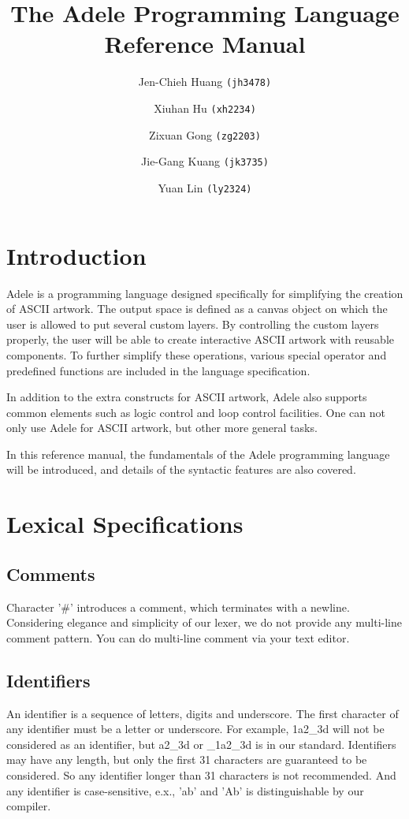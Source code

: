 \documentclass[11pt,letterpaper]{article}
\begin{document}
\title {The Adele Programming Language \\ Reference Manual}
\author {
	Jen-Chieh Huang \texttt{(jh3478)} \and Xiuhan Hu \texttt{(xh2234)} \and     
	Zixuan Gong \texttt{(zg2203)} \and Jie-Gang Kuang \texttt{(jk3735)} \and 
	Yuan Lin \texttt{(ly2324)}
}
\maketitle
\pagebreak
\section {Introduction}
Adele is a programming language designed specifically for simplifying the creation of ASCII artwork. The output space is defined as a canvas object on which the user is allowed to put several custom layers. By controlling the custom layers properly, the user will be able to create interactive ASCII artwork with reusable components. To further simplify these operations, various special operator and predefined functions are included in the language specification.

In addition to the extra constructs for ASCII artwork, Adele also supports common elements such as logic control and loop control facilities. One can not only use Adele for ASCII artwork, but other more general tasks.

In this reference manual, the fundamentals of the Adele programming language will be introduced, and details of the syntactic features are also covered.

\section {Lexical Specifications}
\subsection {Comments}
Character '\#' introduces a comment, which terminates with a newline. Considering elegance and simplicity of our lexer, we do not provide any multi-line comment pattern. You can do multi-line comment via your text editor.

\subsection {Identifiers}
An identifier is a sequence of letters, digits and underscore. The first character of any identifier must be a letter or underscore. For example, 1a2\_3d will not be considered as an identifier, but a2\_3d or \_1a2\_3d is in our standard. Identifiers may have any length, but only the first 31 characters are guaranteed to be considered. So any identifier longer than 31 characters is not recommended. And any identifier is case-sensitive, e.x., 'ab' and 'Ab' is distinguishable by our compiler.
\end{document}
